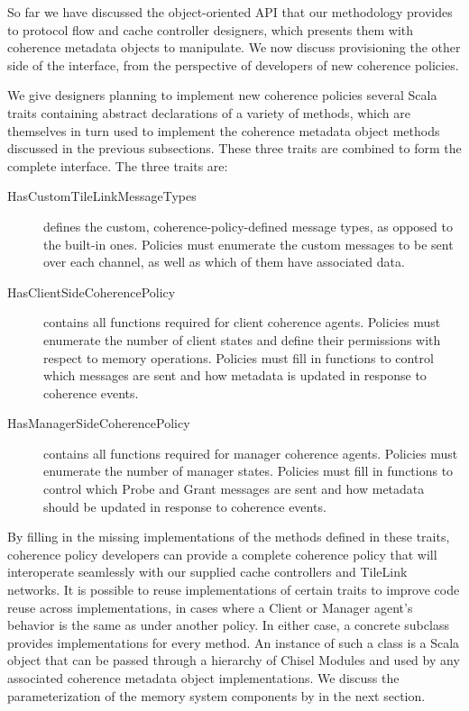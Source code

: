 So far we have discussed the object-oriented API that our methodology provides to
protocol flow and cache controller designers, which presents them with coherence metadata objects
to manipulate.
We now discuss provisioning the other side of the interface, from the perspective
of developers of new coherence policies.

We give designers planning to implement new coherence policies several Scala traits
containing abstract declarations of a variety of methods, which are themselves in turn
used to implement the coherence metadata object methods discussed in the previous subsections.
These three traits are combined to form the complete  interface.
The three traits are:
\begin{description}
\item[HasCustomTileLinkMessageTypes] defines the custom, coherence-policy-defined message types, as opposed to the built-in ones. Policies must enumerate the custom messages to be sent over each channel, as well as which of them have associated data.
\item[HasClientSideCoherencePolicy] contains all functions required for client coherence agents. Policies must enumerate the number of client states and define their permissions with respect to memory operations. Policies must fill in functions to control which messages are sent and how metadata is updated in response to coherence events.
\item[HasManagerSideCoherencePolicy] contains all functions required for manager coherence agents. Policies must enumerate the number of manager states. Policies must fill in functions to control which Probe and Grant messages are sent and how  metadata should be updated in response to coherence events.
\end{description}

By filling in the missing implementations of the methods defined in these traits, 
coherence policy developers can provide a complete coherence policy
that will interoperate seamlessly with our supplied cache controllers and TileLink networks.
It is possible to reuse implementations of certain traits to improve code reuse across  implementations,
in cases where a Client or Manager agent's behavior is the same as under another policy.
In either case, a concrete  subclass provides implementations for every method.
An instance of such a class is a Scala object that can be passed through a hierarchy of
Chisel Modules and used by any associated coherence metadata object implementations.
We discuss the parameterization of the memory system components by 
in the next section.

